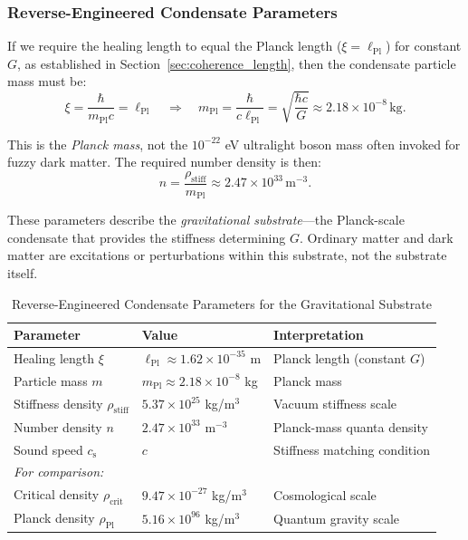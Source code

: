 \documentclass[11pt,a4paper]{article}
\newcommand{\cs}{c_{\mathrm{s}}}
\newcommand{\rhocrit}{\rho_{\mathrm{crit}}}
\newcommand{\rhostiff}{\rho_{\mathrm{stiff}}}
\newcommand{\rhoPl}{\rho_{\mathrm{Pl}}}
\newcommand{\lPl}{\ell_{\mathrm{Pl}}}
\newcommand{\mPl}{m_{\mathrm{Pl}}}
\theoremstyle{definition}
\begin{document}
\subsubsection{Reverse-Engineered Condensate Parameters}
\label{sec:reverse_engineering}

If we require the healing length to equal the Planck length ($\xi = \lPl$) for constant $G$, as established in Section~\ref{sec:coherence_length}, then the condensate particle mass must be:
\begin{equation}
\label{eq:mass_planck}
\xi = \frac{\hbar}{\mPl c} = \lPl \quad \Rightarrow \quad \mPl = \frac{\hbar}{c \lPl} = \sqrt{\frac{\hbar c}{G}} \approx 2.18 \times 10^{-8} \, \text{kg}.
\end{equation}

This is the \emph{Planck mass}, not the $10^{-22}$ eV ultralight boson mass often invoked for fuzzy dark matter. The required number density is then:
\begin{equation}
\label{eq:number_density}
n = \frac{\rhostiff}{\mPl} \approx 2.47 \times 10^{33} \, \text{m}^{-3}.
\end{equation}

These parameters describe the \emph{gravitational substrate}---the Planck-scale condensate that provides the stiffness determining $G$. Ordinary matter and dark matter are excitations or perturbations within this substrate, not the substrate itself.

\begin{table}[H]
\centering
\caption{Reverse-Engineered Condensate Parameters for the Gravitational Substrate}
\label{tab:reverse_engineered}
\begin{tabular}{@{}lll@{}}
\toprule
\textbf{Parameter} & \textbf{Value} & \textbf{Interpretation} \\
\midrule
Healing length $\xi$ & $\lPl \approx 1.62 \times 10^{-35}$ m & Planck length (constant $G$) \\
Particle mass $m$ & $\mPl \approx 2.18 \times 10^{-8}$ kg & Planck mass \\
Stiffness density $\rhostiff$ & $5.37 \times 10^{25}$ kg/m$^3$ & Vacuum stiffness scale \\
Number density $n$ & $2.47 \times 10^{33}$ m$^{-3}$ & Planck-mass quanta density \\
Sound speed $\cs$ & $c$ & Stiffness matching condition \\
\midrule
\multicolumn{3}{l}{\textit{For comparison:}} \\
Critical density $\rhocrit$ & $9.47 \times 10^{-27}$ kg/m$^3$ & Cosmological scale \\
Planck density $\rhoPl$ & $5.16 \times 10^{96}$ kg/m$^3$ & Quantum gravity scale \\
\bottomrule
\end{tabular}
\end{table}
\end{document}
